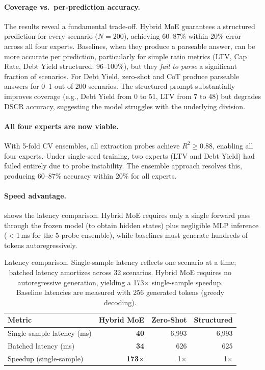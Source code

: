\paragraph{Coverage vs.\ per-prediction accuracy.}
The results reveal a fundamental trade-off. Hybrid MoE guarantees a
structured prediction for every scenario ($N{=}200$), achieving
60--87\% within 20\% error across all four experts. Baselines, when
they produce a parseable answer, can be more accurate per prediction,
particularly for simple ratio metrics (LTV, Cap Rate, Debt Yield
structured: 96--100\%), but they \emph{fail to parse} a
significant fraction of scenarios. For Debt Yield, zero-shot and CoT
produce parseable answers for 0--1 out of 200 scenarios. The structured
prompt substantially improves coverage (e.g., Debt Yield from 0 to 51,
LTV from 7 to 48) but degrades DSCR accuracy, suggesting the model
struggles with the underlying division.

\paragraph{All four experts are now viable.}
With 5-fold CV ensembles, all extraction probes achieve
$R^2 \geq 0.88$, enabling all four experts. Under single-seed training,
two experts (LTV and Debt Yield) had failed entirely due to probe
instability. The ensemble approach resolves this, producing 60--87\%
accuracy within 20\% for all experts.

\paragraph{Speed advantage.}
 shows the latency comparison. Hybrid MoE requires
only a single forward pass through the frozen model (to obtain hidden
states) plus negligible MLP inference ($<$1\,ms for the 5-probe
ensemble), while baselines must generate hundreds of tokens
autoregressively.

\begin{table}[t]
\centering
\begin{tabular}{@{}lrrr@{}}
\toprule
\textbf{Metric} & \textbf{Hybrid MoE} & \textbf{Zero-Shot} & \textbf{Structured} \\
\midrule
Single-sample latency (ms) & \textbf{40} & 6{,}993 & 6{,}993 \\
Batched latency (ms)       & \textbf{34} & 626 & 625 \\
Speedup (single-sample)    & \textbf{173$\times$} & 1$\times$ & 1$\times$ \\
\bottomrule
\end{tabular}
\caption{Latency comparison. Single-sample latency reflects one
scenario at a time; batched latency amortizes across 32 scenarios.
Hybrid MoE requires no autoregressive generation, yielding a
173$\times$ single-sample speedup. Baseline latencies are measured
with 256 generated tokens (greedy decoding).}
\label{tab:latency}
\end{table}

